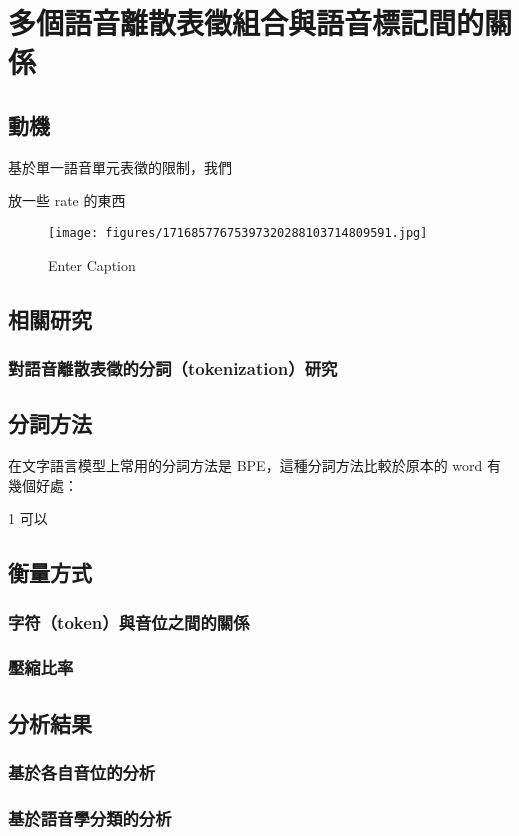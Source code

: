 \chapter{多個語音離散表徵組合與語音標記間的關係}
\section{動機}

基於單一語音單元表徵的限制，我們

放一些 rate 的東西
\begin{figure}
    \centering
    \texttt{[image: figures/17168577675397320288103714809591.jpg]}
    \caption{Enter Caption}
    \label{fig:enter-label}
\end{figure}


\section{相關研究}
\subsection{對語音離散表徵的分詞（tokenization）研究}
\section{分詞方法}

在文字語言模型上常用的分詞方法是 BPE，這種分詞方法比較於原本的 word 有幾個好處：

1 可以


\section{衡量方式}
\subsection{字符（token）與音位之間的關係}
\subsection{壓縮比率}
\section{分析結果}
\subsection{基於各自音位的分析}
\subsection{基於語音學分類的分析}\newpage
